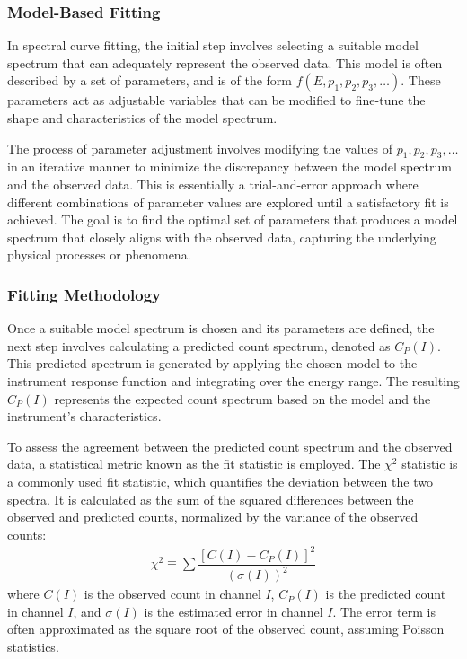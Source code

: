 			\subsubsection{Model-Based Fitting}
				In spectral curve fitting, the initial step involves selecting a suitable model spectrum that can adequately represent the observed data. This model is often described by a set of parameters, and is of the form $f(E,p_1,p_2,p_3,\dots)$. These parameters act as adjustable variables that can be modified to fine-tune the shape and characteristics of the model spectrum.
				
				The process of parameter adjustment involves modifying the values of $p_1,p_2,p_3,\dots$ in an iterative manner to minimize the discrepancy between the model spectrum and the observed data. This is essentially a trial-and-error approach where different combinations of parameter values are explored until a satisfactory fit is achieved. The goal is to find the optimal set of parameters that produces a model spectrum that closely aligns with the observed data, capturing the underlying physical processes or phenomena.
			
			\subsubsection{Fitting Methodology}
				Once a suitable model spectrum is chosen and its parameters are defined, the next step involves calculating a predicted count spectrum, denoted as $C_P(I)$. This predicted spectrum is generated by applying the chosen model to the instrument response function and integrating over the energy range. The resulting $C_P(I)$ represents the expected count spectrum based on the model and the instrument's characteristics.

To assess the agreement between the predicted count spectrum and the observed data, a statistical metric known as the fit statistic is employed. The $\chi^2$ statistic is a commonly used fit statistic, which quantifies the deviation between the two spectra. It is calculated as the sum of the squared differences between the observed and predicted counts, normalized by the variance of the observed counts:
				\begin{align}
					\chi^2\equiv\sum{\dfrac{[C(I)-C_P(I)]^2}{(\sigma(I))^2}} \label{eqn:chi-sq}
				\end{align}
				where $C(I)$ is the observed count in channel $I$, $C_P(I)$ is the predicted count in channel $I$, and $\sigma(I)$ is the estimated error in channel $I$. The error term is often approximated as the square root of the observed count, assuming Poisson statistics.
				
